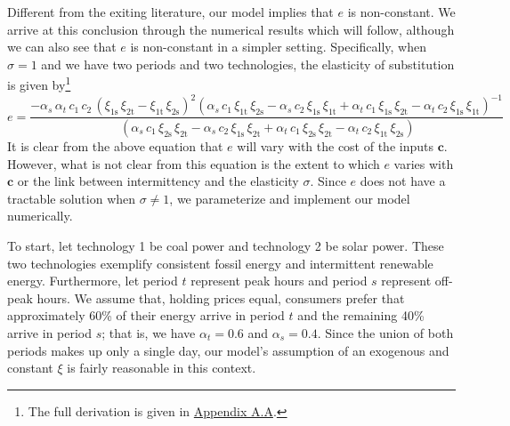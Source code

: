 \documentclass[11pt,a4paper,leqno]{extarticle}
\begin{document}
	Different from the exiting literature, our model implies that $e$ is non-constant. We arrive at this conclusion through the numerical results which will follow, although we can also see that $e$ is non-constant in a simpler setting. Specifically, when $\sigma = 1$ and we have two periods and two technologies, the elasticity of substitution is given by\footnote{The full derivation is given in  \hyperref[sec:EOS_derivation]{Appendix A.A}.}
	\begin{equation}\label{eq:eosmath}
	e = 
	\frac{-\alpha _{s}\,\alpha _{t}\,c_{1}\,c_{2}\,{\left(\xi _{\mathrm{1s}}\,\xi _{\mathrm{2t}}-\xi _{\mathrm{1t}}\,\xi _{\mathrm{2s}}\right)}^2 \left(\alpha _{s}\,c_{1}\,\xi _{\mathrm{1t}}\,\xi _{\mathrm{2s}}-\alpha _{s}\,c_{2}\,\xi _{\mathrm{1s}}\,\xi _{\mathrm{1t}}+\alpha _{t}\,c_{1}\,\xi _{\mathrm{1s}}\,\xi _{\mathrm{2t}}-\alpha _{t}\,c_{2}\,\xi _{\mathrm{1s}}\,\xi _{\mathrm{1t}}\right)^{-1}}{
		\,\left(\alpha _{s}\,c_{1}\,\xi _{\mathrm{2s}}\,\xi _{\mathrm{2t}}-\alpha _{s}\,c_{2}\,\xi _{\mathrm{1s}}\,\xi _{\mathrm{2t}}+\alpha _{t}\,c_{1}\,\xi _{\mathrm{2s}}\,\xi _{\mathrm{2t}}-\alpha _{t}\,c_{2}\,\xi _{\mathrm{1t}}\,\xi _{\mathrm{2s}}\right)
	}
	\end{equation}
	It is clear from the above equation that $e$ will vary with the cost of the inputs $\mathbf{c}$. However, what is not clear from this equation is the extent to which $e$ varies with $\mathbf{c}$ or the link between intermittency and the elasticity $\sigma$. Since $e$ does not have a tractable solution when $\sigma \neq 1$, we parameterize and implement our model numerically. 
	
	To start, let technology 1 be coal power and technology 2 be solar power. These two technologies exemplify consistent fossil energy and intermittent renewable energy.  Furthermore,  let period $t$ represent peak hours and period $s$ represent off-peak hours. We assume that, holding prices equal, consumers prefer that approximately 60\% of their energy arrive in period $t$ and the remaining 40\% arrive in period $s$; that is, we have $\alpha_t = 0.6$ and $\alpha_s = 0.4$. Since the union of both periods makes up only a single day, our model's assumption of an exogenous and constant $\xi$ is fairly reasonable in this context. 
	
\end{document}
